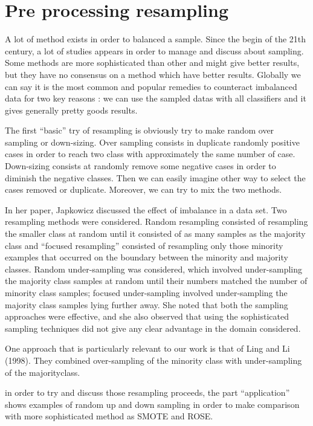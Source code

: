 \documentclass[
]{report}
\begin{document}
\hypertarget{pre-processing-resampling}{%
\section{Pre processing resampling}\label{pre-processing-resampling}}

A lot of method exists in order to balanced a sample. Since the begin of the 21th century, a lot of studies appears in order to manage and discuss about sampling. Some methods are more sophisticated than other and might give better results, but they have no consensus on a method which have better results. Globally we can say it is the most common and popular remedies to counteract imbalanced data for two key reasons : we can use the sampled datas with all classifiers and it gives generally pretty goods results.

The first ``basic'' try of resampling is obviously try to make random over sampling or down-sizing. Over sampling consists in duplicate randomly positive cases in order to reach two class with approximately the same number of case. Down-sizing consists at randomly remove some negative cases in order to diminish the negative classes. Then we can easily imagine other way to select the cases removed or duplicate. Moreover, we can try to mix the two methods.

In her paper, Japkowicz discussed the effect of imbalance in a data set. Two resampling methods were considered. Random resampling consisted of resampling the smaller class at random until it consisted of as many samples as the majority class and ``focused resampling'' consisted of resampling only those minority examples that occurred on the boundary between the minority and majority classes. Random under-sampling was considered, which involved under-sampling the majority class samples at random until their numbers matched the number of minority class samples; focused under-sampling involved under-sampling the majority class samples lying further away. She noted that both the sampling approaches were effective, and she also observed that using the sophisticated sampling techniques did not give any clear advantage in the domain considered. \citep{Jaku}

One approach that is particularly relevant to our work is that of Ling and Li (1998). They combined over-sampling of the minority class with under-sampling of the majorityclass. \citep{ling}

in order to try and discuss those resampling proceeds, the part ``application'' shows examples of random up and down sampling in order to make comparison with more sophisticated method as SMOTE and ROSE.
\end{document}
